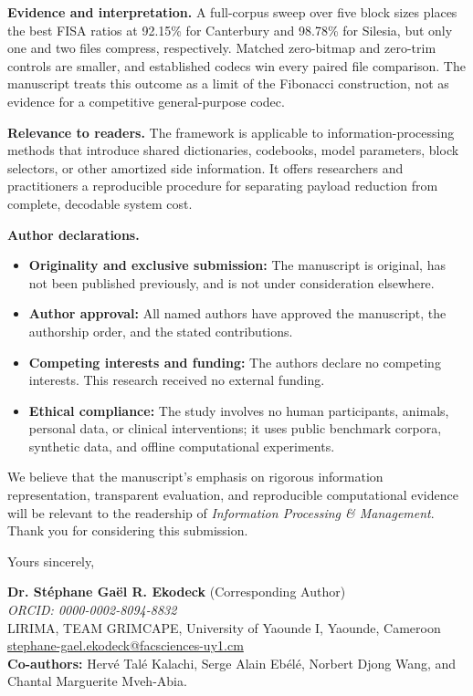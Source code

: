 \documentclass[10pt,a4paper]{article}
\newcommand{\lead}[1]{\textcolor{sectionblue}{\textbf{#1}}}
\begin{document}
\lead{Evidence and interpretation.} A full-corpus sweep over five block sizes
places the best FISA ratios at 92.15\% for Canterbury and 98.78\% for Silesia,
but only one and two files compress, respectively. Matched zero-bitmap and
zero-trim controls are smaller, and established codecs win every paired file
comparison. The manuscript treats this outcome as a limit of the Fibonacci
construction, not as evidence for a competitive general-purpose codec.

\lead{Relevance to readers.} The framework is applicable to
information-processing methods that introduce shared dictionaries, codebooks,
model parameters, block selectors, or other amortized side information. It
offers researchers and practitioners a reproducible procedure for separating
payload reduction from complete, decodable system cost.

\lead{Author declarations.}
\begin{itemize}
  \item \textbf{Originality and exclusive submission:} The manuscript is
  original, has not been published previously, and is not under consideration
  elsewhere.
  \item \textbf{Author approval:} All named authors have approved the
  manuscript, the authorship order, and the stated contributions.
  \item \textbf{Competing interests and funding:} The authors declare no
  competing interests. This research received no external funding.
  \item \textbf{Ethical compliance:} The study involves no human participants,
  animals, personal data, or clinical interventions; it uses public benchmark
  corpora, synthetic data, and offline computational experiments.
\end{itemize}

We believe that the manuscript's emphasis on rigorous information
representation, transparent evaluation, and reproducible computational
evidence will be relevant to the readership of \textit{Information Processing
\& Management}. Thank you for considering this submission.

\begin{center}
Yours sincerely,
\end{center}
\vspace{0.5mm}

\textbf{Dr. St\'ephane Ga\"el R. Ekodeck} (Corresponding Author)\\
\textit{ORCID: 0000-0002-8094-8832}\\
LIRIMA, TEAM GRIMCAPE, University of Yaounde I, Yaounde, Cameroon\\
\href{mailto:stephane-gael.ekodeck@facsciences-uy1.cm}{stephane-gael.ekodeck@facsciences-uy1.cm}\\
\textbf{Co-authors:} Herv\'e Tal\'e Kalachi, Serge Alain Eb\'el\'e, Norbert
Djong Wang, and Chantal Marguerite Mveh-Abia.
\end{document}
